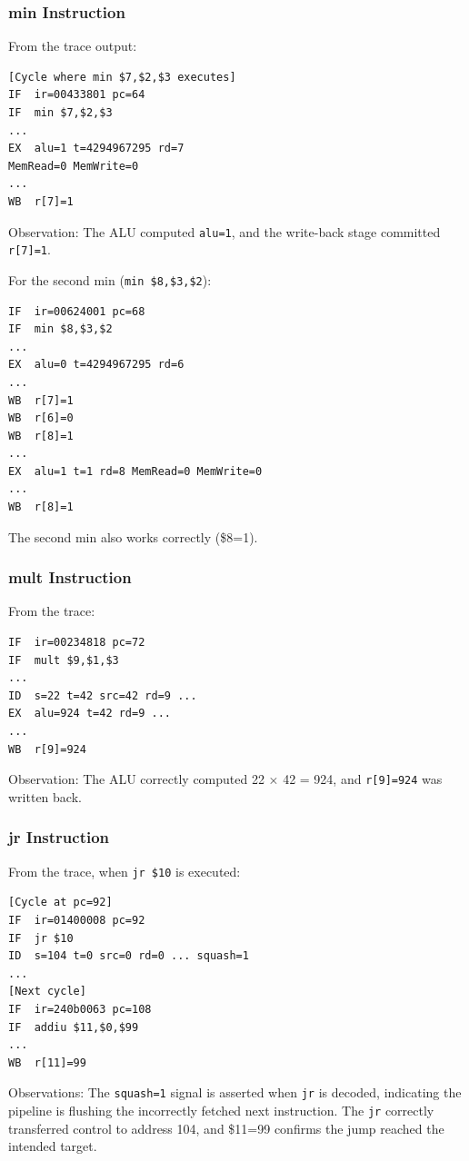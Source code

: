 \documentclass[conference]{IEEEtran}
\begin{document}
\subsubsection{ min Instruction}

From the trace output:

\begin{verbatim}
[Cycle where min $7,$2,$3 executes]
IF  ir=00433801 pc=64
IF  min $7,$2,$3
...
EX  alu=1 t=4294967295 rd=7 
MemRead=0 MemWrite=0
...
WB  r[7]=1
\end{verbatim}

Observation: The ALU computed \texttt{alu=1}, and the write-back stage committed \texttt{r[7]=1}.  

For the second min (\texttt{min \$8,\$3,\$2}):

\begin{verbatim}
IF  ir=00624001 pc=68
IF  min $8,$3,$2
...
EX  alu=0 t=4294967295 rd=6
...
WB  r[7]=1    
WB  r[6]=0    
WB  r[8]=1    
...
EX  alu=1 t=1 rd=8 MemRead=0 MemWrite=0
...
WB  r[8]=1
\end{verbatim}

 The second min also works correctly (\$8=1).

\subsubsection{ mult Instruction}

From the trace:

\begin{verbatim}
IF  ir=00234818 pc=72
IF  mult $9,$1,$3
...
ID  s=22 t=42 src=42 rd=9 ...
EX  alu=924 t=42 rd=9 ...
...
WB  r[9]=924
\end{verbatim}

Observation: The ALU correctly computed 22 × 42 = 924, and \texttt{r[9]=924} was written back.  

\subsubsection{jr Instruction}

From the trace, when \texttt{jr \$10} is executed:

\begin{verbatim}
[Cycle at pc=92]
IF  ir=01400008 pc=92
IF  jr $10
ID  s=104 t=0 src=0 rd=0 ... squash=1  
...
[Next cycle]
IF  ir=240b0063 pc=108    
IF  addiu $11,$0,$99
...
WB  r[11]=99
\end{verbatim}

Observations: The \texttt{squash=1} signal is asserted when \texttt{jr} is decoded, indicating the pipeline is flushing the incorrectly fetched next instruction. The \texttt{jr} correctly transferred control to address 104, and \$11=99 confirms the jump reached the intended target.
\end{document}
